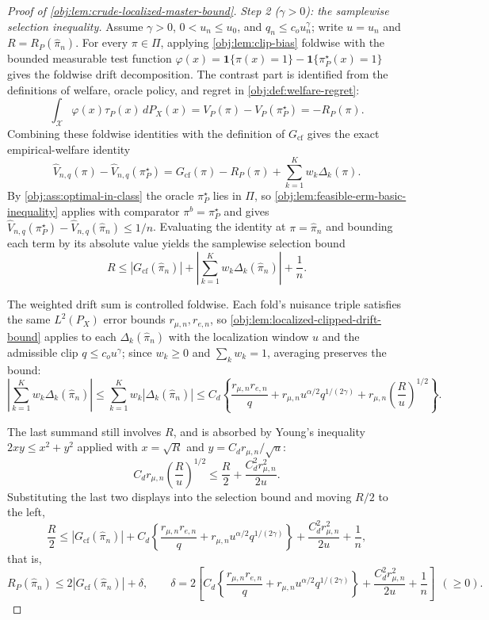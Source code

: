 \documentclass[11pt]{article}
\begin{document}
\begin{proof}[Proof of \cref{obj:lem:crude-localized-master-bound}]
\emph{Step 2 (\(\gamma>0\)): the samplewise selection inequality.}  Assume \(\gamma>0\), \(0<u_n\le u_0\), and \(q_n\le c_ou_n^\gamma\); write \(u=u_n\) and \(R=R_P(\widehat\pi_n)\).  For every \(\pi\in\Pi\), applying \cref{obj:lem:clip-bias} foldwise with the bounded measurable test function \(\varphi(x)=\mathbf 1\{\pi(x)=1\}-\mathbf 1\{\pi^\star_P(x)=1\}\) gives the foldwise drift decomposition.  The contrast part is identified from the definitions of welfare, oracle policy, and regret in \cref{obj:def:welfare-regret}:
\[
\int_{\mathcal X}\varphi(x)\tau_P(x)\,dP_X(x)
=
V_P(\pi)-V_P(\pi^\star_P)
=
-R_P(\pi).
\]
Combining these foldwise identities with the definition of \(G_{\mathrm{cf}}\) gives the exact empirical-welfare identity
\[
\widehat V_{n,q}(\pi)-\widehat V_{n,q}(\pi^\star_P)
=
G_{\mathrm{cf}}(\pi)-R_P(\pi)+\sum_{k=1}^Kw_k\Delta_k(\pi).
\]
By \cref{obj:ass:optimal-in-class} the oracle \(\pi^\star_P\) lies in \(\Pi\), so \cref{obj:lem:feasible-erm-basic-inequality} applies with comparator \(\pi^b=\pi^\star_P\) and gives \(\widehat V_{n,q}(\pi^\star_P)-\widehat V_{n,q}(\widehat\pi_n)\le1/n\).  Evaluating the identity at \(\pi=\widehat\pi_n\) and bounding each term by its absolute value yields the samplewise selection bound
\[
R
\le
\left|G_{\mathrm{cf}}(\widehat\pi_n)\right|
+\left|\sum_{k=1}^Kw_k\Delta_k(\widehat\pi_n)\right|
+\frac1n .
\]

The weighted drift sum is controlled foldwise.  Each fold's nuisance triple satisfies the same \(L^2(P_X)\) error bounds \(r_{\mu,n},r_{e,n}\), so \cref{obj:lem:localized-clipped-drift-bound} applies to each \(\Delta_k(\widehat\pi_n)\) with the localization window \(u\) and the admissible clip \(q\le c_ou^\gamma\); since \(w_k\ge0\) and \(\sum_kw_k=1\), averaging preserves the bound:
\[
\left|\sum_{k=1}^Kw_k\Delta_k(\widehat\pi_n)\right|
\le
\sum_{k=1}^Kw_k\left|\Delta_k(\widehat\pi_n)\right|
\le
C_d\left\{
\frac{r_{\mu,n}r_{e,n}}q
+r_{\mu,n}u^{\alpha/2}q^{1/(2\gamma)}
+r_{\mu,n}\left(\frac{R}u\right)^{1/2}
\right\}.
\]

The last summand still involves \(R\), and is absorbed by Young's inequality \(2xy\le x^2+y^2\) applied with \(x=\sqrt R\) and \(y=C_dr_{\mu,n}/\sqrt u\):
\[
C_d r_{\mu,n}\left(\frac{R}u\right)^{1/2}
\le \frac{R}2+\frac{C_d^2r_{\mu,n}^2}{2u}.
\]
Substituting the last two displays into the selection bound and moving \(R/2\) to the left,
\[
\frac R2
\le
\left|G_{\mathrm{cf}}(\widehat\pi_n)\right|
+C_d\left\{\frac{r_{\mu,n}r_{e,n}}q+r_{\mu,n}u^{\alpha/2}q^{1/(2\gamma)}\right\}
+\frac{C_d^2r_{\mu,n}^2}{2u}
+\frac1n,
\]
that is,
\[
R_P(\widehat\pi_n)\le
2\left|G_{\mathrm{cf}}(\widehat\pi_n)\right|+\delta,
\qquad
\delta
=
2\left[
C_d\left\{\frac{r_{\mu,n}r_{e,n}}q
+r_{\mu,n}u^{\alpha/2}q^{1/(2\gamma)}\right\}
+\frac{C_d^2r_{\mu,n}^2}{2u}
+\frac1n
\right]\ \ (\ge0).
\]


\end{proof}
\end{document}

